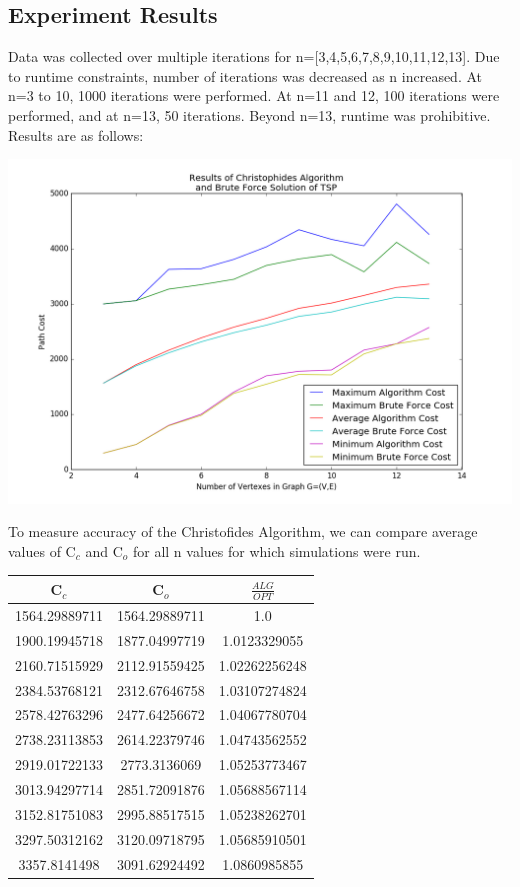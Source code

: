 \documentclass[12pt, oneside]{article}   	%
\begin{document}
\subsection{Experiment Results}
\indent Data was collected over multiple iterations for n=[3,4,5,6,7,8,9,10,11,12,13].  Due to runtime constraints, number of iterations was decreased as n increased.  At n=3 to 10, 1000 iterations were performed.  At n=11 and 12, 100 iterations were performed, and at n=13, 50 iterations.  Beyond n=13, runtime was prohibitive.  Results are as follows:\\
\begin{center}
\includegraphics[scale=0.5]{cost}
\end{center}
\indent To measure accuracy of the Christofides Algorithm, we can compare average values of C$_c$ and C$_o$ for all n values for which simulations were run.\\
\begin{center}
\begin{tabular}{|c|c|c|}
\hline
C$_c$ & C$_o$ & $\frac{ALG}{OPT}$\\
\hline
1564.29889711  &  1564.29889711  &  1.0\\
\hline
1900.19945718  &  1877.04997719  &  1.0123329055\\
\hline
2160.71515929  &  2112.91559425  &  1.02262256248\\
\hline
2384.53768121  &  2312.67646758  &  1.03107274824\\
\hline
2578.42763296  &  2477.64256672  &  1.04067780704\\
\hline
2738.23113853  &  2614.22379746  &  1.04743562552\\
\hline
2919.01722133  &  2773.3136069  &  1.05253773467\\
\hline
3013.94297714  &  2851.72091876  &  1.05688567114\\
\hline
3152.81751083  &  2995.88517515  &  1.05238262701\\
\hline
3297.50312162  &  3120.09718795  &  1.05685910501\\
\hline
3357.8141498  &  3091.62924492  &  1.0860985855\\
\hline
\end{tabular}
\end{center}
\end{document}
